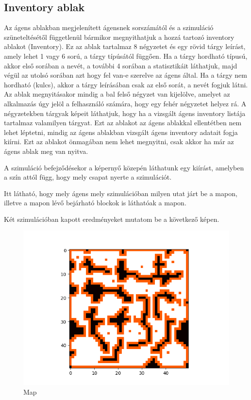 \subsection{Inventory ablak}
Az ágens ablakban megjelenített ágensnek sorszámától és a szimuláció szüneteltésétől függetlenül bármikor megnyithatjuk a hozzá tartozó inventory ablakot (Inventory).
Ez az ablak tartalmaz 8 négyzetet és egy rövid tárgy leírást, amely lehet 1 vagy 6 sorú, a tárgy típúsától függően. Ha a tárgy hordható típusú, akkor első sorában a nevét, 
a további 4 sorában a statisztikáit láthatjuk, majd végül az utolsó sorában azt hogy fel van-e szerelve az ágens által. Ha a tárgy nem hordható (kulcs), 
akkor a tárgy leírásában csak az első sorát, a nevét fogjuk látni.
Az ablak megnyitásakor mindig a bal felső négyzet van kijelölve, amelyet az alkalmazás úgy jelöl a felhasználó számára, hogy egy fehér négyzetet helyez rá.
A négyzetekben tárgyak képeit láthatjuk, hogy ha a vizsgált ágens inventory listája tartalmaz valamilyen tárgyat.
Ezt az ablakot az ágens ablakkal ellentétben nem lehet léptetni, mindig az ágens ablakban vizsgált ágens inventory adatait fogja kiírni.
Ezt az ablakot önmagában nem lehet megnyitni, csak akkor ha már az ágens ablak meg van nyitva.


A szimuláció befejződésekor a képernyő közepén láthatunk egy kiírást, amelyben a szín attól függ, hogy mely csapat nyerte a szimulációt.


Itt látható, hogy mely ágens mely szimulációban milyen utat járt be a mapon, illetve a mapon lévő bejárható blockok is láthatóak a mapon.

Két szimulációban kapott eredményeket mutatom be a következő képen.

\begin{figure}[!ht]
	\centering
	\includegraphics[scale=0.70]{images/map.png}
	\caption{Map}
	\label{fig:map}
\end{figure}

